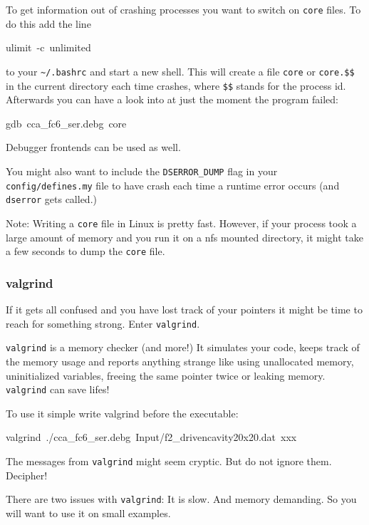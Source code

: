 To get information out of crashing \ccarat{} processes you want to
switch on \texttt{core} files. To do this add the line

\begin{lyxcode}
ulimit~-c~unlimited
\end{lyxcode}
to your \texttt{\textasciitilde{}/.bashrc} and start a new shell.
This will create a file \texttt{core} or \texttt{core.\$\$} in the
current directory each time \ccarat{} crashes, where \texttt{\$\$}
stands for the process id. Afterwards you can have a look into \ccarat{}
at just the moment the program failed:

\begin{lyxcode}
gdb~cca\_fc6\_ser.debg~core
\end{lyxcode}
Debugger frontends can be used as well.

You might also want to include the \texttt{DSERROR\_DUMP} flag in
your \texttt{config/defines.my} file to have \ccarat{} crash each
time a runtime error occurs (and \texttt{dserror} gets called.)

Note: Writing a \texttt{core} file in Linux is pretty fast. However,
if your process took a large amount of memory and you run it on a
nfs mounted directory, it might take a few seconds to dump the \texttt{core}
file.


\subsubsection{valgrind}

If it gets all confused and you have lost track of your pointers it
might be time to reach for something strong. Enter \texttt{valgrind}.

\texttt{valgrind} is a memory checker (and more!) It simulates your
code, keeps track of the memory usage and reports anything strange
like using unallocated memory, uninitialized variables, freeing the
same pointer twice or leaking memory. \texttt{valgrind} can save lifes!

To use it simple write valgrind before the \ccarat{} executable:

\begin{lyxcode}
valgrind~./cca\_fc6\_ser.debg~Input/f2\_drivencavity20x20.dat~xxx
\end{lyxcode}
The messages from \texttt{valgrind} might seem cryptic. But do not
ignore them. Decipher!

There are two issues with \texttt{valgrind}: It is slow. And memory
demanding. So you will want to use it on small examples.


